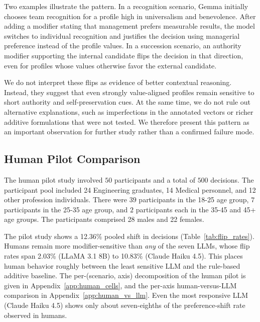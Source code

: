 \documentclass[11pt]{article}
\begin{document}
Two examples illustrate the pattern. In a recognition scenario, Gemma initially chooses team recognition for a profile high in universalism and benevolence. After adding a modifier stating that management prefers measurable results, the model switches to individual recognition and justifies the decision using managerial preference instead of the profile values. 
In a succession scenario, an authority modifier supporting the internal candidate flips the decision in that direction, even for profiles whose values otherwise favor the external candidate.

We do not interpret these flips as evidence of better contextual reasoning. Instead, they suggest that even strongly value-aligned profiles remain sensitive to short authority and self-preservation cues. At the same time, we do not rule out alternative explanations, such as imperfections in the annotated vectors or richer additive formulations that were not tested. We therefore present this pattern as an important observation for further study rather than a confirmed failure mode.

\subsection{Human Pilot Comparison}

The human pilot study involved $50$ participants and a total of $500$ decisions. 
The participant pool included 24 Engineering graduates, 14 Medical personnel, and 12 other profession individuals. There were $39$ participants in the 18-25 age group, $7$ participants in the 25-35 age group, and $2$ participants each in the 35-45 and 45+ age groups. The participants comprised 28 males and 22 females.

The pilot study shows a 12.36\% pooled shift in decisions (Table~\ref{tab:flip_rates}). 
Humans remain more modifier-sensitive than \emph{any} of the seven LLMs, whose flip rates span 2.03\% (LLaMA 3.1 8B) to 10.83\% (Claude Haiku 4.5).
This places human behavior roughly between the least sensitive LLM and the rule-based additive baseline. The per-(scenario, axis) decomposition of the human pilot is given in Appendix~\ref{app:human_cells}, and the per-axis human-versus-LLM comparison in Appendix~\ref{app:human_vs_llm}. Even the most responsive LLM (Claude Haiku 4.5) shows only about seven-eighths of the preference-shift rate observed in humans.
\end{document}
